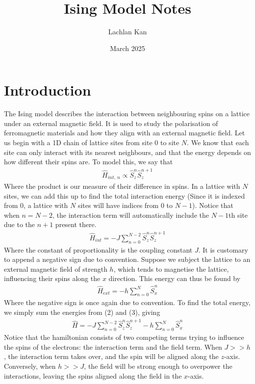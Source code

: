 \documentclass{article}
\title{Ising Model Notes}
\author{Lachlan Kan}
\date{March 2025}
\begin{document}
\maketitle
\section{Introduction}
The Ising model describes the interaction between neighbouring spins on a lattice
under an external magnetic field. It is used to study the polarisation of ferromagnetic 
materials and how they align with an external magnetic field. Let us begin with 
a 1D chain of lattice sites from site 0 to site $N$. We know that each site can only interact with its nearest neighbours, and that 
the energy depends on how different their spins are. To model this, we say that 
\begin{align}
    \hat{H}_{int,\ n}\propto\hat{S}_z^n \hat{S}_z^{n+1}
\end{align}
Where the product is our measure of their difference in spins.
 In a lattice with $N$ sites, we can add this up to find 
the total interaction energy (Since it is indexed from 0, a lattice with $N$ sites 
will have indices from $0$ to $N-1$). 
Notice that when $n=N-2$, the interaction term will automatically include the $N-1$th site due to 
the $n+1$ present there. 
\begin{align}
    \hat{H}_{int}=-J\sum_{n=0}^{N-2}\hat{S}_z^n \hat{S}_z^{n+1}
\end{align}
Where the constant of proportionality is the coupling constant $J$. It is customary to append a negative sign due to convention. 
Suppose we subject the lattice to an external magnetic field of strength $h$, which tends to 
magnetise the lattice, influencing their spins along the $x$ direction. This energy can thus be 
found by 
\begin{align}
    \hat{H}_{ext}=-h\sum_{n=0}^N\hat{S}_x^n
\end{align}
Where the negative sign is once again due to convention. 
To find the total energy, we simply sum the energies from (2) and (3), giving 
\begin{align}
    \hat{H}=-J\sum_{n=0}^{N-2}\hat{S}_z^n \hat{S}_z^{n+1}-h\sum_{n=0}^N\hat{S}_x^n
\end{align}
Notice that the hamiltonian consists of two competing terms trying to influence the spins of the electrons: the interaction term and the field term. 
When $J>>h$, the interaction term takes over, 
and the spin will be aligned along the $z$-axis. Conversely, when 
$h>>J$, the field will be strong enough to overpower the interactions, 
leaving the spins aligned 
along the field in the $x$-axis. 
\end{document}
